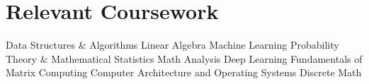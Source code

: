 \section{Relevant Coursework}
\vspace*{-1.5\multicolsep}
\begin{multicols}{4}
    \begin{itemize}[itemsep=0pt, parsep=0pt, leftmargin=*]
        \entry Data Structures \& Algorithms
        \entry Linear Algebra
        \entry Machine Learning
        \entry Probability Theory \& Mathematical Statistics
        \entry Math Analysis
        \entry Deep Learning
        \entry Fundamentals of Matrix Computing
        \entry Computer Architecture and Operating Systems
        \entry Discrete Math
    \end{itemize}
\end{multicols}
